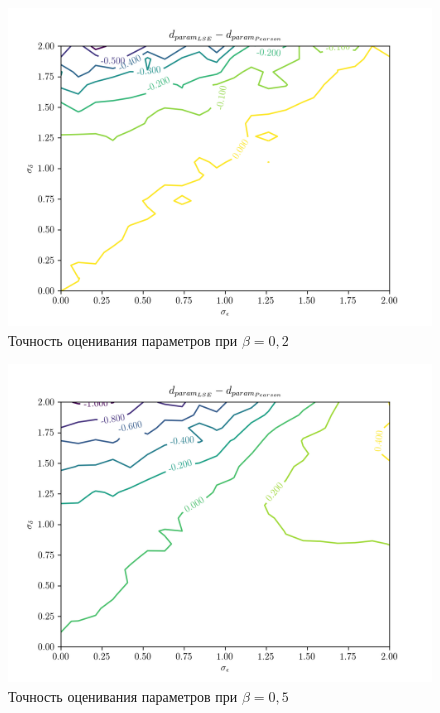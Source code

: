 \begin{figure}[h]
  \centering
  \includegraphics[width=150mm]{fig/linear/param/beta-0,2_param.png}
  \caption{Точность оценивания параметров при \( \beta = 0{,}2 \)}
\end{figure}

\begin{figure}[h]
  \centering
  \includegraphics[width=150mm]{fig/linear/param/beta-0,5_param.png}
  \caption{Точность оценивания параметров при \( \beta = 0{,}5 \)}
\end{figure}

